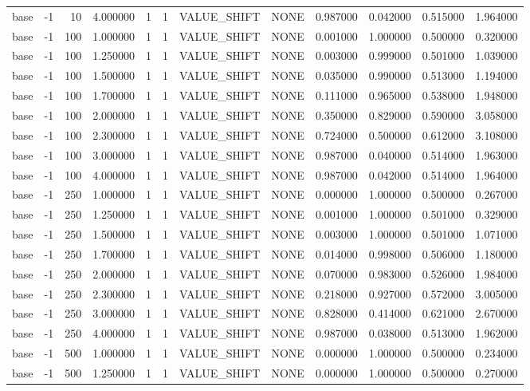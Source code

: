 \begin{tabular}{lrrrllllrrrr}
base & -1 & 10 & 4.000000 & 1 & 1 & VALUE_SHIFT & NONE & 0.987000 & 0.042000 & 0.515000 & 1.964000 \\
base & -1 & 100 & 1.000000 & 1 & 1 & VALUE_SHIFT & NONE & 0.001000 & 1.000000 & 0.500000 & 0.320000 \\
base & -1 & 100 & 1.250000 & 1 & 1 & VALUE_SHIFT & NONE & 0.003000 & 0.999000 & 0.501000 & 1.039000 \\
base & -1 & 100 & 1.500000 & 1 & 1 & VALUE_SHIFT & NONE & 0.035000 & 0.990000 & 0.513000 & 1.194000 \\
base & -1 & 100 & 1.700000 & 1 & 1 & VALUE_SHIFT & NONE & 0.111000 & 0.965000 & 0.538000 & 1.948000 \\
base & -1 & 100 & 2.000000 & 1 & 1 & VALUE_SHIFT & NONE & 0.350000 & 0.829000 & 0.590000 & 3.058000 \\
base & -1 & 100 & 2.300000 & 1 & 1 & VALUE_SHIFT & NONE & 0.724000 & 0.500000 & 0.612000 & 3.108000 \\
base & -1 & 100 & 3.000000 & 1 & 1 & VALUE_SHIFT & NONE & 0.987000 & 0.040000 & 0.514000 & 1.963000 \\
base & -1 & 100 & 4.000000 & 1 & 1 & VALUE_SHIFT & NONE & 0.987000 & 0.042000 & 0.514000 & 1.964000 \\
base & -1 & 250 & 1.000000 & 1 & 1 & VALUE_SHIFT & NONE & 0.000000 & 1.000000 & 0.500000 & 0.267000 \\
base & -1 & 250 & 1.250000 & 1 & 1 & VALUE_SHIFT & NONE & 0.001000 & 1.000000 & 0.501000 & 0.329000 \\
base & -1 & 250 & 1.500000 & 1 & 1 & VALUE_SHIFT & NONE & 0.003000 & 1.000000 & 0.501000 & 1.071000 \\
base & -1 & 250 & 1.700000 & 1 & 1 & VALUE_SHIFT & NONE & 0.014000 & 0.998000 & 0.506000 & 1.180000 \\
base & -1 & 250 & 2.000000 & 1 & 1 & VALUE_SHIFT & NONE & 0.070000 & 0.983000 & 0.526000 & 1.984000 \\
base & -1 & 250 & 2.300000 & 1 & 1 & VALUE_SHIFT & NONE & 0.218000 & 0.927000 & 0.572000 & 3.005000 \\
base & -1 & 250 & 3.000000 & 1 & 1 & VALUE_SHIFT & NONE & 0.828000 & 0.414000 & 0.621000 & 2.670000 \\
base & -1 & 250 & 4.000000 & 1 & 1 & VALUE_SHIFT & NONE & 0.987000 & 0.038000 & 0.513000 & 1.962000 \\
base & -1 & 500 & 1.000000 & 1 & 1 & VALUE_SHIFT & NONE & 0.000000 & 1.000000 & 0.500000 & 0.234000 \\
base & -1 & 500 & 1.250000 & 1 & 1 & VALUE_SHIFT & NONE & 0.000000 & 1.000000 & 0.500000 & 0.270000 \\

\end{tabular}

